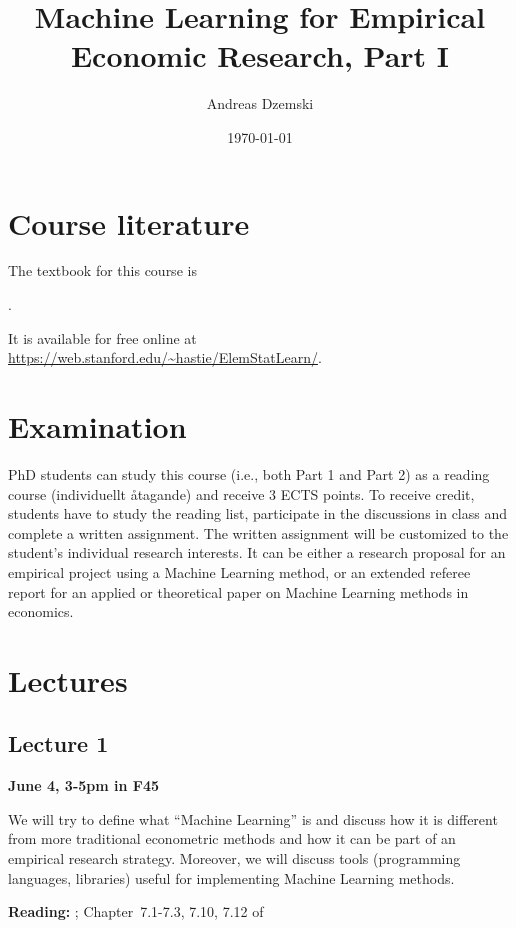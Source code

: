 \documentclass[a4paper]{scrartcl}
\title{Machine Learning for Empirical Economic Research, Part I}
\author{Andreas Dzemski}
\date{\today}
\begin{document}
\maketitle

\section*{Course literature}
The textbook for this course is

\vspace*{6pt}\noindent
{}.

\vspace*{6pt}\noindent
It is available for free online at \url{https://web.stanford.edu/~hastie/ElemStatLearn/}.


\section*{Examination}
PhD students can study this course (i.e., both Part 1 and Part 2) as a reading course (individuellt åtagande) and receive 3 ECTS points. To receive credit, students have to study the reading list, participate in the discussions in class and complete a written assignment. The written assignment will be customized to the student’s individual research interests. It can be either a research proposal for an empirical project using a Machine Learning method, or an extended referee report for an applied or theoretical paper on Machine Learning methods in economics.


\section*{Lectures}
\subsection*{Lecture 1}

\textbf{June 4, 3-5pm in F45}

\vspace*{6pt}\noindent
We will try to define what “Machine Learning” is and discuss how it is different from more traditional econometric methods and how it can be part of an empirical research strategy. Moreover, we will discuss tools (programming languages, libraries) useful for implementing Machine Learning methods. 


\vspace{6pt}
\textbf{Reading:} \textcite{mullainathan2017machine}; \textcite{varian2014big}
Chapter~7.1-7.3, 7.10, 7.12 of \textcite{hastie2009elements}
\end{document}
